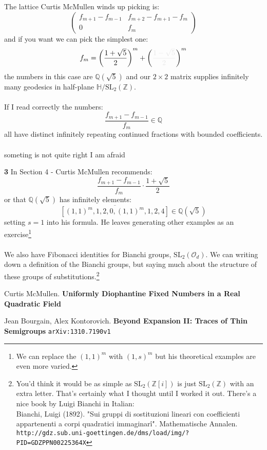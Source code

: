 \documentclass[12pt]{article}
\begin{document}
\newpage

\noindent The lattice Curtis McMullen winds up picking is:
$$ \left(
\begin{array}{c|c}
f_{m+1}- f_{m-1} & f_{m+2} - f_{m+1} - f_m \\ \hline
0 & f_m
\end{array}
\right) $$
and if you want we can pick the simplest one:
$$ f_m = \left( 
\frac{1+\sqrt{5}}{2}
\right)^m
+ \left( {\color{black!10!white}{
\frac{1-\sqrt{5}}{2}}}
\right)^m$$
the numbers in this case are $\mathbb{Q}(\sqrt{5})$ and our $2 \times 2$ matrix supplies infinitely many geodesics in half-plane $\mathbb{H}/\mathrm{SL}_2(\mathbb{Z})$.  \\ \\
If I read correctly the numbers:
$$ \frac{f_{m+1} - f_{m-1}}{f_m} \in \mathbb{Q}$$
all have distinct infinitely repeating continued fractions with bounded coefficients. \\ \\ someting is not quite right I am afraid

\newpage

\noindent \textbf{3} In Section 4 - Curtis McMullen recommends:
$$ \frac{f_{m+1} - f_{m-1}}{f_m} \cdot \frac{1+\sqrt{5}}{2} $$
or that $\mathbb{Q}(\sqrt{5})$ has infinitely elements:
$$ \overline{[(1,1)^m, 1, 2, 0, (1,1)^m, 1, 2, 4]} \in \mathbb{Q}(\sqrt{5})$$
setting $s = 1$ into his formula. He leaves generating other examples as an exercise\footnote{We can replace the $(1,1)^m$ with $(1,s)^m$ but his theoretical examples are even more varied.} \\ \\
We also have Fibonacci identities for Bianchi groups, $\mathrm{SL}_2(\mathcal{O}_d)$.  We can writing down a definition of the Bianchi groups, but saying much about the structure of these groups of substitutions.\footnote{You'd think it would be as simple as $\mathrm{SL}_2(\mathbb{Z}[i])$ is just $\mathrm{SL}_2(\mathbb{Z})$ with an extra letter.  That's certainly what I thought until I worked it out.  There's a nice book by Luigi Bianchi in Italian: \\
Bianchi, Luigi (1892). "Sui gruppi di sostituzioni lineari con coefficienti appartenenti a corpi quadratici immaginarî". Mathematische Annalen. 
\texttt{http://gdz.sub.uni-goettingen.de/dms/load/img/?PID=GDZPPN00225364X} } 

\newpage

\selectfont \fontsize{12}{10}\selectfont

\begin{thebibliography}{}

\item Curtis McMullen.  \textbf{Uniformly Diophantine Fixed Numbers in a Real Quadratic Field}

\item Jean Bourgain, Alex Kontorovich.
\textbf{Beyond Expansion II: Traces of Thin Semigroups} \texttt{arXiv:1310.7190v1}

\end{thebibliography}
\end{document}
